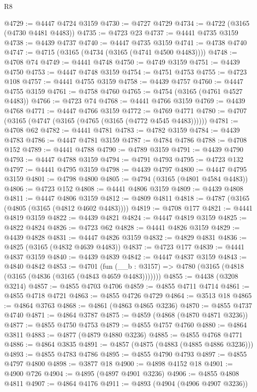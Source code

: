 \begin{lexlean}{R8}
\begin{coremodule}
@4729 := @4447 @4724 @3159
@4730 := @4727 @4729
@4734 := @4722 (@3165 (@4730 @4481 @4483))
@4735 := @4723 @23
@4737 := @4441 @4735 @3159
@4738 := @4439 @4737
@4740 := @4447 @4735 @3159
@4741 := @4738 @4740
@4747 := @4715 (@3165 (@4734 (@3165 (@4741 @4500 @4483))))
@4748 := @4708 @74
@4749 := @4441 @4748
@4750 := @4749 @3159
@4751 := @4439 @4750
@4753 := @4447 @4748 @3159
@4754 := @4751 @4753
@4755 := @4723 @108
@4757 := @4441 @4755 @3159
@4758 := @4439 @4757
@4760 := @4447 @4755 @3159
@4761 := @4758 @4760
@4765 := @4754 (@3165 (@4761 @4527 @4483))
@4766 := @4723 @74
@4768 := @4441 @4766 @3159
@4769 := @4439 @4768
@4771 := @4447 @4766 @3159
@4772 := @4769 @4771
@4780 := @4707 (@3165 (@4747 (@3165 (@4765 (@3165 (@4772 @4545 @4483))))))
@4781 := @4708 @62
@4782 := @4441 @4781
@4783 := @4782 @3159
@4784 := @4439 @4783
@4786 := @4447 @4781 @3159
@4787 := @4784 @4786
@4788 := @4708 @152
@4789 := @4441 @4788
@4790 := @4789 @3159
@4791 := @4439 @4790
@4793 := @4447 @4788 @3159
@4794 := @4791 @4793
@4795 := @4723 @132
@4797 := @4441 @4795 @3159
@4798 := @4439 @4797
@4800 := @4447 @4795 @3159
@4801 := @4798 @4800
@4805 := @4794 (@3165 (@4801 @4584 @4483))
@4806 := @4723 @152
@4808 := @4441 @4806 @3159
@4809 := @4439 @4808
@4811 := @4447 @4806 @3159
@4812 := @4809 @4811
@4818 := @4787 (@3165 (@4805 (@3165 (@4812 @4602 @4483))))
@4819 := @4708 @177
@4821 := @4441 @4819 @3159
@4822 := @4439 @4821
@4824 := @4447 @4819 @3159
@4825 := @4822 @4824
@4826 := @4723 @62
@4828 := @4441 @4826 @3159
@4829 := @4439 @4828
@4831 := @4447 @4826 @3159
@4832 := @4829 @4831
@4836 := @4825 (@3165 (@4832 @4639 @4483))
@4837 := @4723 @177
@4839 := @4441 @4837 @3159
@4840 := @4439 @4839
@4842 := @4447 @4837 @3159
@4843 := @4840 @4842
@4853 := @4701
    (fun (__b : @3157) => @4780 (@3165 (@4818 (@3165 (@4836 (@3165 (@4843 @4659 @4483)))))))
@4855 := @4438 (@3208 @3214)
@4857 := @4855 @4703 @4706
@4859 := @4855 @4711 @4714
@4861 := @4855 @4718 @4721
@4863 := @4855 @4726 @4729
@4864 := @3513 @18
@4865 := @4864 @3763
@4868 := @4861 (@4863 @4865 @3236)
@4870 := @4855 @4737 @4740
@4871 := @4864 @3787
@4875 := @4859 (@4868 (@4870 @4871 @3236))
@4877 := @4855 @4750 @4753
@4879 := @4855 @4757 @4760
@4880 := @4864 @3811
@4883 := @4877 (@4879 @4880 @3236)
@4885 := @4855 @4768 @4771
@4886 := @4864 @3835
@4891 := @4857 (@4875 (@4883 (@4885 @4886 @3236)))
@4893 := @4855 @4783 @4786
@4895 := @4855 @4790 @4793
@4897 := @4855 @4797 @4800
@4898 := @3877 @18
@4900 := @4898 @4152 @18
@4901 := @4900 @726
@4904 := @4895 (@4897 @4901 @3236)
@4906 := @4855 @4808 @4811
@4907 := @4864 @4176
@4911 := @4893 (@4904 (@4906 @4907 @3236))

\end{coremodule}
\end{lexlean}
